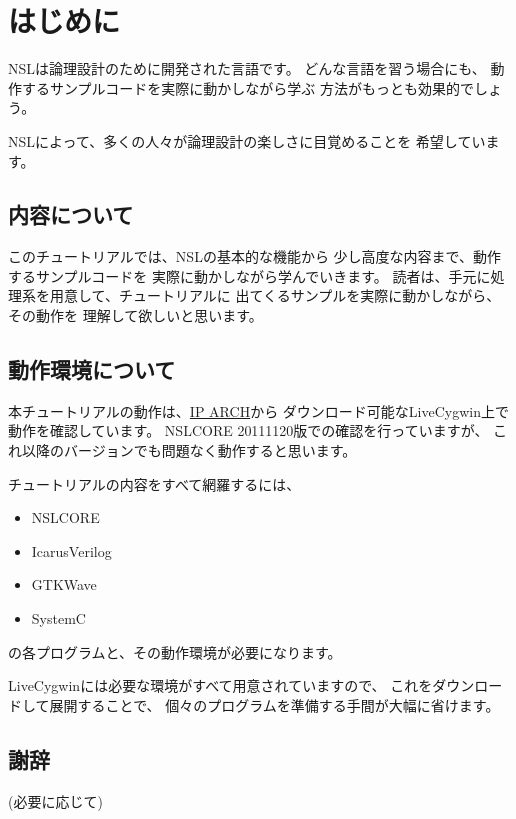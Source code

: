 \chapter{はじめに}
\label{chap:preface}

NSLは論理設計のために開発された言語です。
どんな言語を習う場合にも、
動作するサンプルコードを実際に動かしながら学ぶ
方法がもっとも効果的でしょう。

NSLによって、多くの人々が論理設計の楽しさに目覚めることを
希望しています。

\section*{内容について}

このチュートリアルでは、NSLの基本的な機能から
少し高度な内容まで、動作するサンプルコードを
実際に動かしながら学んでいきます。
読者は、手元に処理系を用意して、チュートリアルに
出てくるサンプルを実際に動かしながら、その動作を
理解して欲しいと思います。

\section*{動作環境について}

本チュートリアルの動作は、\href{http://www.ip-arch.jp/}{IP ARCH}から
ダウンロード可能なLiveCygwin上で動作を確認しています。
NSLCORE 20111120版での確認を行っていますが、
これ以降のバージョンでも問題なく動作すると思います。

チュートリアルの内容をすべて網羅するには、

\begin{itemize}
\item NSLCORE
\item IcarusVerilog
\item GTKWave
\item SystemC
\end{itemize}

の各プログラムと、その動作環境が必要になります。

LiveCygwinには必要な環境がすべて用意されていますので、
これをダウンロードして展開することで、
個々のプログラムを準備する手間が大幅に省けます。

\section*{謝辞}

(必要に応じて)
